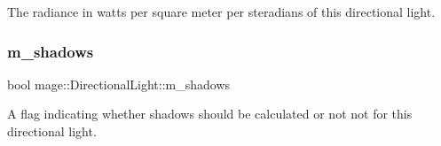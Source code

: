 The radiance in watts per square meter per steradians of this directional light. \hypertarget{classmage_1_1_directional_light_a607a3dc01ee180f2044fe154c2b73903}{}\label{classmage_1_1_directional_light_a607a3dc01ee180f2044fe154c2b73903} 
\subsubsection{\texorpdfstring{m\+\_\+shadows}{m\_shadows}}
{\footnotesize\ttfamily bool mage\+::\+Directional\+Light\+::m\+\_\+shadows\hspace{0.3cm}{\ttfamily [private]}}

A flag indicating whether shadows should be calculated or not not for this directional light. 